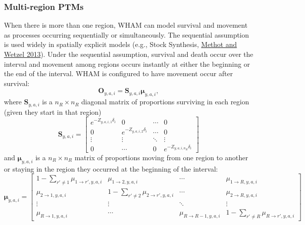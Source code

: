 \documentclass[
]{article}
\begin{document}
\hypertarget{multi-region-ptms}{%
\subsubsection*{Multi-region PTMs}\label{multi-region-ptms}}

When there is more than one region, WHAM can model survival and movement as processes occurring sequentially or simultaneously. The sequential assumption is used widely in spatially explicit models (e.g., Stock Synthesis, \protect\hyperlink{ref-methotwetzel13}{Methot and Wetzel 2013}). Under the sequential assumption, survival and death occur over the interval and movement among regions occurs instantly at either the beginning or the end of the interval. WHAM is configured to have movement occur after survival:
\begin{equation*}
  \mathbf{O}_{y,a,i} = \mathbf{S}_{y,a,i}\boldsymbol{\mu}_{y,a,i},
\end{equation*}
where \(\mathbf{S}_{y,a,i}\) is a \(n_R \times n_R\) diagonal matrix of proportions surviving in each region (given they start in that region)
\begin{equation*}
\mathbf{S}_{y,a,i} = 
  \begin{bmatrix}
    e^{-Z_{y,a,i,1}\delta_i} & 0 & \cdots & 0 \\
    0 & e^{-Z_{y,a,i,2}\delta_i} & \cdots & 0 \\
    \vdots & \vdots & \ddots & \vdots \\
    0 & \cdots & 0 & e^{-Z_{y,a,i,n_R}\delta_i}
  \end{bmatrix}
\end{equation*}
and \(\boldsymbol{\mu}_{y,a,i}\) is a \(n_R \times n_R\) matrix of proportions moving from one region to another or staying in the region they occurred at the beginning of the interval:
\begin{equation*}
\boldsymbol{\mu}_{y,a,i} = 
  \begin{bmatrix}
    1-\sum_{r' \neq 1} \mu_{1\rightarrow r',y,a,i} & \mu_{1\rightarrow 2,y,a,i} & \cdots & \mu_{1\rightarrow R,y,a,i} \\
    \mu_{2\rightarrow 1,y,a,i} & 1-\sum_{r' \neq 2} \mu_{2\rightarrow r',y,a,i} & \cdots & \mu_{2\rightarrow R,y,a,i} \\
    \vdots & \vdots & \ddots & \vdots \\
    \mu_{R\rightarrow 1,y,a,i} & \cdots & \mu_{R\rightarrow R-1,y,a,i} & 1-\sum_{r' \neq R} \mu_{R\rightarrow r',y,a,i}
  \end{bmatrix}
\end{equation*}
\end{document}
